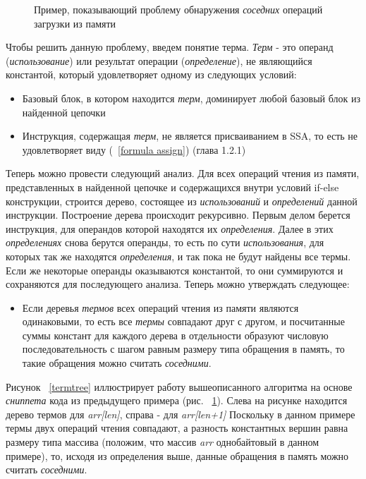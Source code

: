 \begin{figure}[!htb]
    \centering
    
    \caption{Пример, показывающий проблему обнаружения \textit{соседних} операций загрузки из памяти}
    \label{codetoir}
\end{figure}

Чтобы решить данную проблему, введем понятие терма. \textit{Терм} - это операнд (\textit{использование}) или результат операции (\textit{определение}), не являющийся константой, который удовлетворяет одному из следующих условий:

\begin{itemize}
    \item Базовый блок, в котором находится \textit{терм}, доминирует любой базовый блок из найденной цепочки
    \item Инструкция, содержащая \textit{терм}, не является присваиванием в SSA, то есть не удовлетворяет виду (~\ref{formula assign}) (глава 1.2.1)
\end{itemize}

Теперь можно провести следующий анализ. Для всех операций чтения из памяти, представленных в найденной цепочке и содержащихся внутри условий if-else конструкции, строится дерево, состоящее из \textit{использований} и \textit{определений} данной инструкции. Построение дерева происходит рекурсивно. Первым делом берется инструкция, для операндов которой находятся их \textit{определения}. Далее в этих \textit{определениях} снова берутся операнды, то есть по сути \textit{использования}, для которых так же находятся \textit{определения}, и так пока не будут найдены все термы. Если же некоторые операнды оказываются константой, то они суммируются и сохраняются для последующего анализа. Теперь можно утверждать следующее:

\begin{itemize}
    \item Если деревья \textit{термов} всех операций чтения из памяти являются одинаковыми, то есть все \textit{термы} совпадают друг с другом, и посчитанные суммы констант для каждого дерева в отдельности образуют числовую последовательность с шагом равным размеру типа обращения в память, то такие обращения можно считать \textit{соседними}.
\end{itemize}

Рисунок ~\ref{termtree} иллюстрирует работу вышеописанного алгоритма на основе \textit{сниппета} кода из предыдущего примера (рис. ~\ref{codetoir}). Слева на рисунке находится дерево термов для \textit{arr[len]}, справа - для \textit{arr[len+1]} Поскольку в данном примере термы двух операций чтения совпадают, а разность константных вершин равна размеру типа массива (положим, что массив \textit{arr} однобайтовый в данном примере), то, исходя из определения выше, данные обращения в память можно считать \textit{соседними}.

